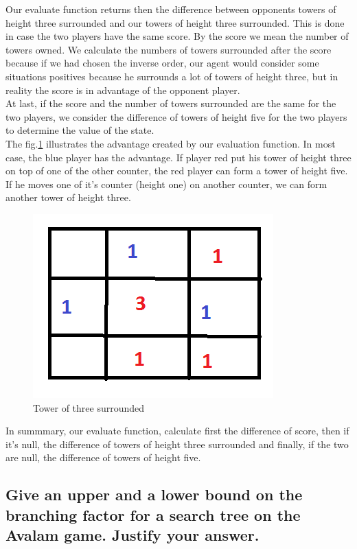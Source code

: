 \documentclass[10pt,a4paper]{article}
\begin{document}
Our evaluate function returns then the difference between opponents towers of height three surrounded and our towers of height three surrounded. This is done in case the two players have the same score. By the score we mean the number of towers owned. We calculate the numbers of towers surrounded after the score because if we had chosen the inverse order, our agent would consider some situations positives because he surrounds a lot of towers of height three, but in reality the score is in advantage of the opponent player.\\

At last, if the score and the number of towers surrounded are the same for the two players, we consider the difference of towers of height five for the two players to determine the value of the state. \\

The fig.\ref{evaluation} illustrates the advantage created by our evaluation function.
In most case, the blue player has the advantage. If player red put his tower of height three on top of one of the other counter, the red player can form a tower of height five. If he moves one of it's counter (height one) on another counter, we can form another tower of height three.\\

\begin{figure}[h]
\center
\includegraphics[scale=0.4]{img/evaluation.png} 
\caption{\label{evaluation} Tower of three surrounded}
\end{figure}


In summmary, our evaluate function, calculate first the difference of score, then if it's null, the difference of towers of height three surrounded and finally, if the two are null, the difference of towers of height five.

\subsection{Give an upper and a lower bound on the branching factor for a search tree on the Avalam game. Justify your answer.}
\end{document}
